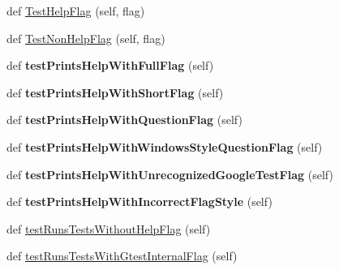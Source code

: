 \begin{DoxyCompactItemize}
\item 
def \hyperlink{classgtest__help__test_1_1GTestHelpTest_a26cc1a64bd67278252ebfcd0ac0dca0c}{Test\+Help\+Flag} (self, flag)
\item 
def \hyperlink{classgtest__help__test_1_1GTestHelpTest_a03ffa91ecf6193ed2ed80b53933112ab}{Test\+Non\+Help\+Flag} (self, flag)
\item 
\mbox{\label{classgtest__help__test_1_1GTestHelpTest_ad91b46ad4506ff52b337b63f6b6c2ad1}} 
def {\bfseries test\+Prints\+Help\+With\+Full\+Flag} (self)
\item 
\mbox{\label{classgtest__help__test_1_1GTestHelpTest_a3dd96058d093a89350769b4e2cc36563}} 
def {\bfseries test\+Prints\+Help\+With\+Short\+Flag} (self)
\item 
\mbox{\label{classgtest__help__test_1_1GTestHelpTest_aafd4d1857c2538c8b1f7cc5a5d1e38b4}} 
def {\bfseries test\+Prints\+Help\+With\+Question\+Flag} (self)
\item 
\mbox{\label{classgtest__help__test_1_1GTestHelpTest_a7be99cd30193e2eecf79f9d65f561afc}} 
def {\bfseries test\+Prints\+Help\+With\+Windows\+Style\+Question\+Flag} (self)
\item 
\mbox{\label{classgtest__help__test_1_1GTestHelpTest_a701abb8f34df726b9129d7654cb32066}} 
def {\bfseries test\+Prints\+Help\+With\+Unrecognized\+Google\+Test\+Flag} (self)
\item 
\mbox{\label{classgtest__help__test_1_1GTestHelpTest_ab8d379bbb0da7403ced599f4ee498728}} 
def {\bfseries test\+Prints\+Help\+With\+Incorrect\+Flag\+Style} (self)
\item 
def \hyperlink{classgtest__help__test_1_1GTestHelpTest_ae7831f92e8e3763c07afb908915b3d20}{test\+Runs\+Tests\+Without\+Help\+Flag} (self)
\item 
def \hyperlink{classgtest__help__test_1_1GTestHelpTest_a0ebec2e3154d22a63e362d2196f9c638}{test\+Runs\+Tests\+With\+Gtest\+Internal\+Flag} (self)
\end{DoxyCompactItemize}


